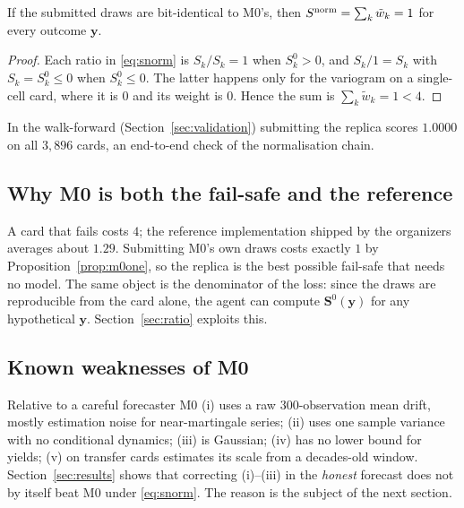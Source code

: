 \begin{proposition}\label{prop:m0one}
If the submitted draws are bit-identical to M0's, then $S^{\mathrm{norm}}=\sum_k\tilde w_k=1$ for every outcome $\bm y$.
\end{proposition}
\begin{proof}
Each ratio in \eqref{eq:snorm} is $S_k/S_k=1$ when $S_k^0>0$, and $S_k/1=S_k$ with $S_k=S^0_k\le0$ when $S^0_k\le0$. The latter happens only for the
variogram on a single-cell card, where it is $0$ and its weight is $0$. Hence the sum is $\sum_k\tilde w_k=1<4$.
\end{proof}
In the walk-forward (Section~\ref{sec:validation}) submitting the replica scores $1.0000$ on all $3{,}896$ cards, an end-to-end check of the
normalisation chain.

\subsection{Why M0 is both the fail-safe and the reference}

A card that fails costs $4$; the reference implementation shipped by the organizers averages about $1.29$. Submitting M0's own draws costs
exactly $1$ by Proposition~\ref{prop:m0one}, so the replica is the best possible fail-safe that needs no model. The same object is the
denominator of the loss: since the draws are reproducible from the card alone, the agent can compute $\bm S^0(\bm y)$ for any hypothetical
$\bm y$. Section~\ref{sec:ratio} exploits this.

\subsection{Known weaknesses of M0}

Relative to a careful forecaster M0 (i) uses a raw $300$-observation mean drift, mostly estimation noise for near-martingale series;
(ii) uses one sample variance with no conditional dynamics; (iii) is Gaussian; (iv) has no lower bound for yields; (v) on transfer cards
estimates its scale from a decades-old window. Section~\ref{sec:results} shows that correcting (i)--(iii) in the \emph{honest} forecast does not by
itself beat M0 under \eqref{eq:snorm}. The reason is the subject of the next section.
